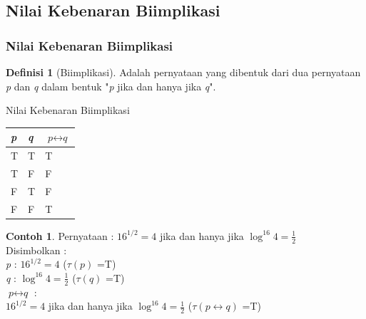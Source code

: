 \documentclass[handout]{beamer}
\theoremstyle{definition}
\newtheorem{definisi}[theorem]{Definisi}
\theoremstyle{example}
\newtheorem{contoh}[theorem]{Contoh}
\begin{document}
\subsection{Nilai Kebenaran Biimplikasi}
\begin{frame}[shrink]
	\frametitle{Nilai Kebenaran Biimplikasi}
	\begin{definisi}[Biimplikasi]
			Adalah pernyataan yang dibentuk dari dua pernyataan \textit{p} dan \textit{q} dalam bentuk "\textit{p} jika dan hanya jika \textit{q}". 	
	\end{definisi}
	\begin{block}{Nilai Kebenaran Biimplikasi}
		\begin{tabular}{ | l | l | l | }
			\hline
			\textit{p} & \textit{q} & $\textit{p}\leftrightarrow\textit{q}$ \\ \hline
			T & T & T \\ \hline
			T & F & F \\ \hline
			F & T & F \\ \hline
			F & F & T \\     		 
			\hline
		\end{tabular}
	\end{block}
	\begin{contoh}
			Pernyataan : $16^{1/2} = 4$ jika dan hanya jika $\log^{16}{4} = \frac{1}{2}$\\
			Disimbolkan :\\
			\textit{p} : $16^{1/2} = 4$ ($\tau(\textit{p})$ =T)\\
			\textit{q} : $\log^{16}{4} = \frac{1}{2}$ ($\tau(\textit{q})$ =T)\\
			$\textit{p}\leftrightarrow\textit{q}$ : \\$16^{1/2} = 4$ jika dan hanya jika $\log^{16}{4} = \frac{1}{2}$ ($\tau(\textit{p}\leftrightarrow\textit{q})$ =T)	
	\end{contoh}
\end{frame}
\end{document}
